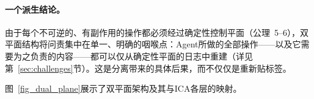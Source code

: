 \paragraph{一个派生结论。}
由于每个不可逆的、有副作用的操作都必须经过确定性控制平面（公理~5--6），双平面结构将问责集中在单一、明确的咽喉点：Agent所做的全部操作——以及它需要为之负责的内容——都可以仅从确定性平面的日志中重建（详见第~\ref{sec:challenges}节）。这是分离带来的具体后果，而不仅仅是重新贴标签。

图~\ref{fig_dual_plane}展示了双平面架构及其与ICA各层的映射。


